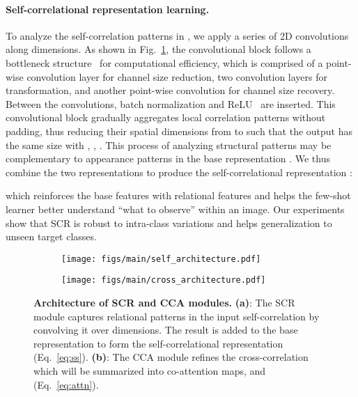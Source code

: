 \documentclass[10pt,twocolumn,letterpaper]{article}
\newcommand{\abbself}{SCR\xspace}
\newcommand{\abbcross}{CCA\xspace}
\begin{document}
\paragraph{Self-correlational representation learning.}
To analyze the self-correlation patterns in , we apply a series of 2D convolutions along  dimensions.
As shown in Fig.~\ref{fig:self_architecture}, 
the convolutional block follows a bottleneck structure~\cite{inceptions} for computational efficiency, which is comprised of a point-wise convolution layer for channel size reduction, two  convolution layers for transformation, and another point-wise convolution for channel size recovery.
Between the convolutions, batch normalization\cite{batchnorm} and ReLU~\cite{relu} are inserted.
This convolutional block  gradually aggregates local correlation patterns without padding, thus reducing their spatial dimensions from  to  such that the output  has the same size with , \ie, . 
This process of analyzing structural patterns may be complementary to appearance patterns in the base representation . 
We thus combine the two representations to produce the self-correlational representation :

which reinforces the base features with relational features and helps the few-shot learner better understand ``what to observe'' within an image.
Our experiments show that \abbself is robust to intra-class variations and helps generalization to unseen target classes.








\begin{figure}[t!]
\begin{subfigure}[t]{.49\linewidth}
\texttt{[image: figs/main/self\_architecture.pdf]}
\captionlistentry{}
\label{fig:self_architecture}
\end{subfigure}
\hfill
\begin{subfigure}[t]{.49\linewidth}
\texttt{[image: figs/main/cross\_architecture.pdf]}
\captionlistentry{}
\label{fig:cross_architecture}
\end{subfigure}
\vspace{-3mm}
\caption{
\textbf{Architecture of \abbself and \abbcross modules.}
\textbf{(a)}: The \abbself module captures relational patterns in the input self-correlation  by convolving it over  dimensions.
The result  is added to the base representation  to form the self-correlational representation  (Eq.~\ref{eq:ss}).
\textbf{(b)}: The \abbcross module refines the cross-correlation which will be summarized into co-attention maps,  and  (Eq.~\ref{eq:attn}).
\label{fig:self_cross_architecture}
}
\vspace{-2mm}
\end{figure}
\end{document}
